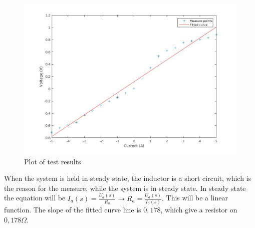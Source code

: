 \begin{figure}[H]
 	\centering
  \includegraphics[scale=.4]{figures/aMotorArmatureResistance}
	\caption{Plot of test results}
\end{figure}

When the system is held in steady state, the inductor is a short circuit, which is the reason for the measure, while the system is in steady state. In steady state the equation will be $I_a (s) = \frac{U_a (s)}{R_a} \longrightarrow R_a = \frac{U_a (s)}{I_a (s)}.$ This will be a linear function. The slope of the fitted curve line is $0,178$, which give a resistor on $0,178 \Omega$.